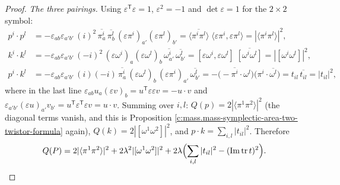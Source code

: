 \documentclass[11pt]{article}
\theoremstyle{definition}
\theoremstyle{plain}
\providecommand{\tr}{}\renewcommand{\tr}{\operatorname{tr}}
\providecommand{\br}{}\renewcommand{\br}[1]{\langle #1\rangle}
\begin{document}
\begin{proof}
\emph{The three pairings.} Using $\varepsilon^{\mathsf T}\varepsilon = 1$, $\varepsilon^{2} = -1$ and $\det\varepsilon = 1$ for the $2\times 2$ symbol:
\begin{align*}
p^{i}\cdot p^{l} &= -\varepsilon_{ab}\varepsilon_{a'b'}\,(i)^{2}\,\overline{\pi^{i}_{a}}\,\overline{\pi^{l}_{b}}\,(\varepsilon\pi^{i})_{a'}(\varepsilon\pi^{l})_{b'}
= \overline{\br{\pi^{i}\pi^{l}}}\;\br{\varepsilon\pi^{i},\varepsilon\pi^{l}} = |\br{\pi^{i}\pi^{l}}|^{2},\\
k^{i}\cdot k^{l} &= -\varepsilon_{ab}\varepsilon_{a'b'}\,(-i)^{2}\,(\varepsilon\omega^{i})_{a}(\varepsilon\omega^{l})_{b}\,\overline{\omega^{i}_{a'}}\,\overline{\omega^{l}_{b'}}
= [\varepsilon\omega^{i},\varepsilon\omega^{l}]\;\overline{[\omega^{i}\omega^{l}]} = |[\omega^{i}\omega^{l}]|^{2},\\
p^{i}\cdot k^{l} &= -\varepsilon_{ab}\varepsilon_{a'b'}\,(i)(-i)\,\overline{\pi^{i}_{a}}\,(\varepsilon\omega^{l})_{b}\,(\varepsilon\pi^{i})_{a'}\,\overline{\omega^{l}_{b'}}
= -\bigl(-\overline{\pi^{i}}\cdot\omega^{l}\bigr)\bigl(\pi^{i}\cdot\overline{\omega^{l}}\bigr) = t_{il}\,\overline{t_{il}} = |t_{il}|^{2},
\end{align*}
where in the last line $\varepsilon_{ab}u_{a}(\varepsilon v)_{b} = u^{\mathsf T}\varepsilon\varepsilon v = -u\cdot v$ and $\varepsilon_{a'b'}(\varepsilon u)_{a'}v_{b'} = u^{\mathsf T}\varepsilon^{\mathsf T}\varepsilon v = u\cdot v$. Summing over $i, l$: $Q(p) = 2|\br{\pi^{1}\pi^{2}}|^{2}$ (the diagonal terms vanish, and this is Proposition \ref{c:mass.mass-symplectic-area-two-twistor-formula} again), $Q(k) = 2|[\omega^{1}\omega^{2}]|^{2}$, and $p\cdot k = \sum_{i,l}|t_{il}|^{2}$. Therefore
\[
Q(P) = 2|\br{\pi^{1}\pi^{2}}|^{2} + 2\lambda^{2}|[\omega^{1}\omega^{2}]|^{2} + 2\lambda\Bigl(\sum_{i,l}|t_{il}|^{2} - (\mathrm{Im}\tr t)^{2}\Bigr).
\]


\end{proof}
\end{document}
